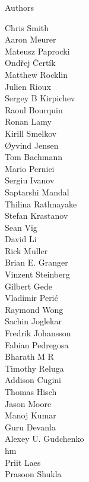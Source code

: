 \documentclass[xcolor=svgnames]{beamer}
\begin{document}
\begin{frame}{Authors}
  \begin{multicols}{5}
    \tiny
        Chris Smith\\
        Aaron Meurer\\
        Mateusz Paprocki\\
        Ondřej Čertík\\
        Matthew Rocklin\\
        Julien Rioux\\
        Sergey B Kirpichev\\
        Raoul Bourquin\\
        Ronan Lamy\\
        Kirill Smelkov\\
        Øyvind Jensen\\
        Tom Bachmann\\
        Mario Pernici\\
        Sergiu Ivanov\\
        Saptarshi Mandal\\
        Thilina Rathnayake\\
        Stefan Krastanov\\
        Sean Vig\\
        David Li\\
        Rick Muller\\
        Brian E. Granger\\
        Vinzent Steinberg\\
        Gilbert Gede\\
        Vladimir Perić\\
        Raymond Wong\\
        Sachin Joglekar\\
        Fredrik Johansson\\
        Fabian Pedregosa\\
        Bharath M R\\
        Timothy Reluga\\
        Addison Cugini\\
        Thomas Hisch\\
        Jason Moore\\
        Manoj Kumar\\
        Guru Devanla\\
        Alexey U. Gudchenko\\
        hm\\
        Priit Laes\\
        Prasoon Shukla\\

\end{multicols}
\end{frame}
\end{document}
